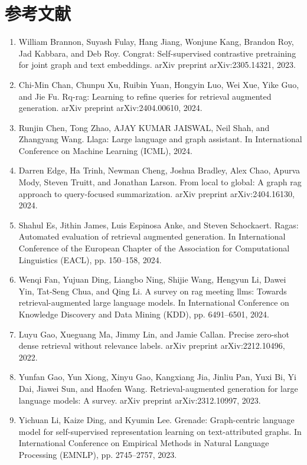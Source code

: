 \documentclass[11pt,UTF8,fontset=fandol]{ctexart}
\begin{document}
\section*{参考文献}
\begin{enumerate}[leftmargin=2em]
\item William Brannon, Suyash Fulay, Hang Jiang, Wonjune Kang, Brandon Roy, Jad Kabbara, and Deb Roy. Congrat: Self-supervised contrastive pretraining for joint graph and text embeddings. arXiv preprint arXiv:2305.14321, 2023.
\item Chi-Min Chan, Chunpu Xu, Ruibin Yuan, Hongyin Luo, Wei Xue, Yike Guo, and Jie Fu. Rq-rag: Learning to refine queries for retrieval augmented generation. arXiv preprint arXiv:2404.00610, 2024.
\item Runjin Chen, Tong Zhao, AJAY KUMAR JAISWAL, Neil Shah, and Zhangyang Wang. Llaga: Large language and graph assistant. In International Conference on Machine Learning (ICML), 2024.
\item Darren Edge, Ha Trinh, Newman Cheng, Joshua Bradley, Alex Chao, Apurva Mody, Steven Truitt, and Jonathan Larson. From local to global: A graph rag approach to query-focused summarization. arXiv preprint arXiv:2404.16130, 2024.
\item Shahul Es, Jithin James, Luis Espinosa Anke, and Steven Schockaert. Ragas: Automated evaluation of retrieval augmented generation. In International Conference of the European Chapter of the Association for Computational Linguistics (EACL), pp. 150--158, 2024.
\item Wenqi Fan, Yujuan Ding, Liangbo Ning, Shijie Wang, Hengyun Li, Dawei Yin, Tat-Seng Chua, and Qing Li. A survey on rag meeting llms: Towards retrieval-augmented large language models. In International Conference on Knowledge Discovery and Data Mining (KDD), pp. 6491--6501, 2024.
\item Luyu Gao, Xueguang Ma, Jimmy Lin, and Jamie Callan. Precise zero-shot dense retrieval without relevance labels. arXiv preprint arXiv:2212.10496, 2022.
\item Yunfan Gao, Yun Xiong, Xinyu Gao, Kangxiang Jia, Jinliu Pan, Yuxi Bi, Yi Dai, Jiawei Sun, and Haofen Wang. Retrieval-augmented generation for large language models: A survey. arXiv preprint arXiv:2312.10997, 2023.
\item Yichuan Li, Kaize Ding, and Kyumin Lee. Grenade: Graph-centric language model for self-supervised representation learning on text-attributed graphs. In International Conference on Empirical Methods in Natural Language Processing (EMNLP), pp. 2745--2757, 2023.

\end{enumerate}
\end{document}
